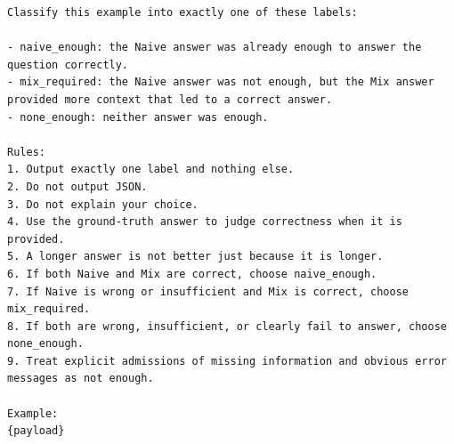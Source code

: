 \documentclass[english, bibtex]{kththesis}               %
\numberwithin{listing}{chapter}
\begin{document}
\begin{lstlisting}[basicstyle=\ttfamily\small,breaklines=true,columns=fullflexible]
Classify this example into exactly one of these labels:

- naive_enough: the Naive answer was already enough to answer the question correctly.
- mix_required: the Naive answer was not enough, but the Mix answer provided more context that led to a correct answer.
- none_enough: neither answer was enough.

Rules:
1. Output exactly one label and nothing else.
2. Do not output JSON.
3. Do not explain your choice.
4. Use the ground-truth answer to judge correctness when it is provided.
5. A longer answer is not better just because it is longer.
6. If both Naive and Mix are correct, choose naive_enough.
7. If Naive is wrong or insufficient and Mix is correct, choose mix_required.
8. If both are wrong, insufficient, or clearly fail to answer, choose none_enough.
9. Treat explicit admissions of missing information and obvious error messages as not enough.

Example:
{payload}
\end{lstlisting}

\cleardoublepage

\label{pg:lastPageofMainmatter}

\cleardoublepage
\clearpage\thispagestyle{empty}\mbox{} %
\kthbackcover
\end{document}

